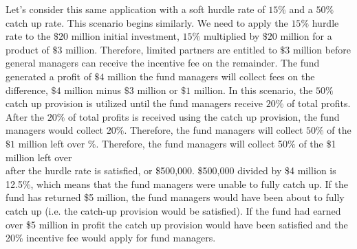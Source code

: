 \documentclass[11pt]{article}
\begin{document}
Let's consider this same application with a soft hurdle rate of $15 \%$ and a $50 \%$ catch up rate. This scenario begins similarly. We need to apply the $15 \%$ hurdle rate to the $\$ 20$ million initial investment, $15 \%$ multiplied by $\$ 20$ million for a product of $\$ 3$ million. Therefore, limited partners are entitled to $\$ 3$ million before general managers can receive the incentive fee on the remainder. The fund generated a profit of $\$ 4$ million the fund managers will collect fees on the difference, $\$ 4$ million minus $\$ 3$ million or $\$ 1$ million. In this scenario, the $50 \%$ catch up provision is utilized until the fund managers receive $20 \%$ of total profits. After the $20 \%$ of total profits is received using the catch up provision, the fund managers would collect $20 \%$. Therefore, the fund managers will collect $50 \%$ of the $\$ 1$ million left over \%. Therefore, the fund managers will collect 50\% of the \$1 million left over\\
after the hurdle rate is satisfied, or \$500,000. \$500,000 divided by \$4 million is 12.5\%, which means that the fund managers were unable to fully catch up. If the\\
fund has returned \$5 million, the fund managers would have been about to fully catch up (i.e. the catch-up provision would be satisfied). If the fund had earned\\
over \$5 million in profit the catch up provision would have been satisfied and the 20\% incentive fee would apply for fund managers.
\end{document}
